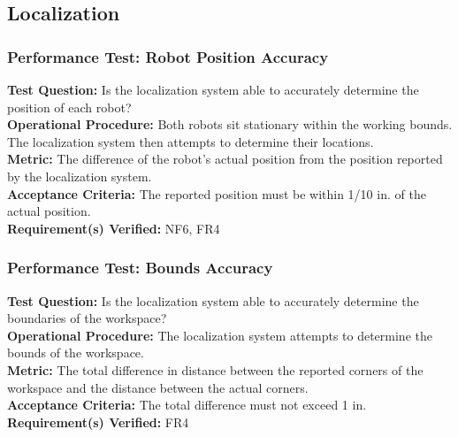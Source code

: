 
\subsection{Localization}
\label{sec:verification_localization}

\subsubsection{Performance Test: Robot Position Accuracy}
\label{test:localization_pt_accuracy}
\textbf{Test Question:} Is the localization system able to accurately determine the position of each robot?\\
\textbf{Operational Procedure:} Both robots sit stationary within the working bounds. The localization system then attempts to determine their locations.\\
\textbf{Metric:} The difference of the robot's actual position from the position reported by the localization system. \\
\textbf{Acceptance Criteria:} The reported position must be within 1/10 in. of the actual position.\\
\textbf{Requirement(s) Verified:} NF6, FR4 \\

\subsubsection{Performance Test: Bounds Accuracy}
\label{test:localization_pt_bounds}
\textbf{Test Question:} Is the localization system able to accurately determine the boundaries of the workspace?\\
\textbf{Operational Procedure:} The localization system attempts to determine the bounds of the workspace.\\
\textbf{Metric:} The total difference in distance between the reported corners of the workspace and the distance between the actual corners.\\
\textbf{Acceptance Criteria:} The total difference must not exceed 1 in.\\
\textbf{Requirement(s) Verified:} FR4 \\

